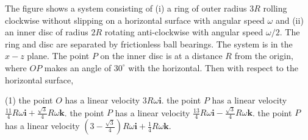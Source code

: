 
\item The figure shows a system consisting of (i) a ring of outer radius \(3R\) rolling clockwise without slipping on a horizontal surface with angular speed \(\omega\) and (ii) an inner disc of radius \(2R\) rotating anti-clockwise with angular speed \(\omega/2\). The ring and disc are separated by frictionless ball bearings. The system is in the \(x-z\) plane. The point \(P\) on the inner disc is at a distance \(R\) from the origin, where \(OP\) makes an angle of \(30^\circ\) with the horizontal. Then with respect to the horizontal surface,
    \begin{center}
    \end{center}
    \begin{tasks}(1)
        \task the point \(O\) has a linear velocity \(3R\omega \mathbf{i}\).
        \task the point \(P\) has a linear velocity \(\frac{11}{4} R\omega \mathbf{i} + \frac{\sqrt{3}}{4} R\omega \mathbf{k}\).
        \task the point \(P\) has a linear velocity \(\frac{13}{4} R\omega \mathbf{i} - \frac{\sqrt{3}}{4} R\omega \mathbf{k}\).
        \task the point \(P\) has a linear velocity \(\left(3 - \frac{\sqrt{3}}{4}\right) R\omega \mathbf{i} + \frac{1}{4} R\omega \mathbf{k}\).
    \end{tasks}
